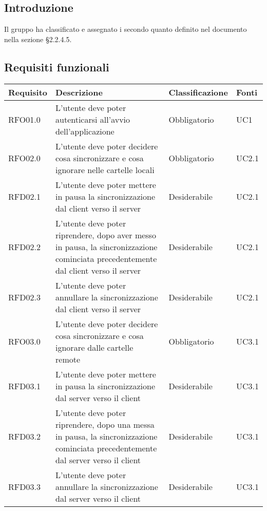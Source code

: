 \subsection{Introduzione}
Il gruppo \gruppo{} ha classificato e assegnato i  secondo quanto definito nel documento \NdP{} \versNdP{} nella sezione \S{}2.2.4.5.

\subsection{Requisiti funzionali}
{
    \setlength{\freewidth}{\dimexpr\textwidth-8\tabcolsep}
    \renewcommand{\arraystretch}{1.5}
    \centering
    \setlength{\aboverulesep}{0pt}
    \setlength{\belowrulesep}{0pt}
    \begin{longtable}{C{.20\freewidth} C{.40\freewidth} C{.20\freewidth} C{.20\freewidth}}
        \toprule 
        \textbf{Requisito} & \textbf{Descrizione} & \textbf{Classificazione} & \textbf{Fonti} \\
        \toprule
        \endhead

        RFO01.0  & L'utente deve poter autenticarsi all'avvio dell'applicazione & Obbligatorio & UC1 \\

        RFO02.0  & L'utente deve poter decidere cosa sincronizzare e cosa ignorare nelle cartelle locali & Obbligatorio & UC2.1 \\
        RFD02.1  & L'utente deve poter mettere in pausa la sincronizzazione dal client verso il server & Desiderabile & UC2.1 \\
        RFD02.2  & L'utente deve poter riprendere, dopo aver messo in pausa, la sincronizzazione cominciata precedentemente dal client verso il server & Desiderabile & UC2.1 \\
        RFD02.3  & L'utente deve poter annullare la sincronizzazione dal client verso il server & Desiderabile & UC2.1 \\

        RFO03.0  & L'utente deve poter decidere cosa sincronizzare e cosa ignorare dalle cartelle remote & Obbligatorio & UC3.1 \\
        RFD03.1  & L'utente deve poter mettere in pausa la sincronizzazione dal server verso il client & Desiderabile & UC3.1 \\
        RFD03.2  & L'utente deve poter riprendere, dopo una messa in pausa, la sincronizzazione cominciata precedentemente dal server verso il client & Desiderabile & UC3.1 \\
        RFD03.3  & L'utente deve poter annullare la sincronizzazione dal server verso il client & Desiderabile & UC3.1 \\


\end{longtable}}
